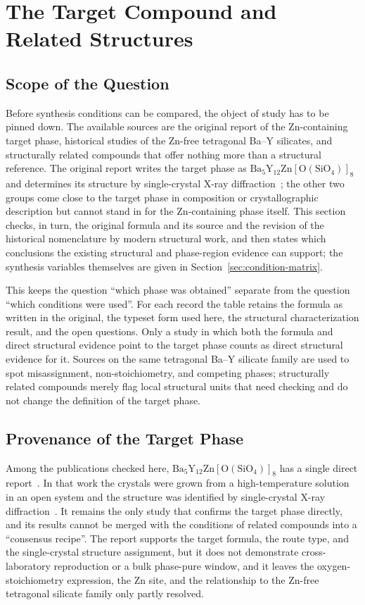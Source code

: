 \section{The Target Compound and Related Structures}
\label{sec:identity}

\subsection{Scope of the Question}

Before synthesis conditions can be compared, the object of study has to be pinned down. The available sources are the original report of the Zn-containing target phase, historical studies of the Zn-free tetragonal Ba--Y silicates, and structurally related compounds that offer nothing more than a structural reference. The original report writes the target phase as $\mathrm{Ba_5Y_{12}Zn[O(SiO_4)]_8}$ and determines its structure by single-crystal X-ray diffraction~\cite{ababaikeri2024ba5y12zn}; the other two groups come close to the target phase in composition or crystallographic description but cannot stand in for the Zn-containing phase itself. This section checks, in turn, the original formula and its source and the revision of the historical nomenclature by modern structural work, and then states which conclusions the existing structural and phase-region evidence can support; the synthesis variables themselves are given in Section~\ref{sec:condition-matrix}.

This keeps the question ``which phase was obtained'' separate from the question ``which conditions were used''. For each record the table retains the formula as written in the original, the typeset form used here, the structural characterization result, and the open questions. Only a study in which both the formula and direct structural evidence point to the target phase counts as direct structural evidence for it. Sources on the same tetragonal Ba--Y silicate family are used to spot misassignment, non-stoichiometry, and competing phases; structurally related compounds merely flag local structural units that need checking and do not change the definition of the target phase.

\subsection{Provenance of the Target Phase}

Among the publications checked here, $\mathrm{Ba_5Y_{12}Zn[O(SiO_4)]_8}$ has a single direct report~\cite{ababaikeri2024ba5y12zn}. In that work the crystals were grown from a high-temperature solution in an open system and the structure was identified by single-crystal X-ray diffraction~\cite{ababaikeri2024ba5y12zn}. It remains the only study that confirms the target phase directly, and its results cannot be merged with the conditions of related compounds into a ``consensus recipe''. The report supports the target formula, the route type, and the single-crystal structure assignment, but it does not demonstrate cross-laboratory reproduction or a bulk phase-pure window, and it leaves the oxygen-stoichiometry expression, the Zn site, and the relationship to the Zn-free tetragonal silicate family only partly resolved.

